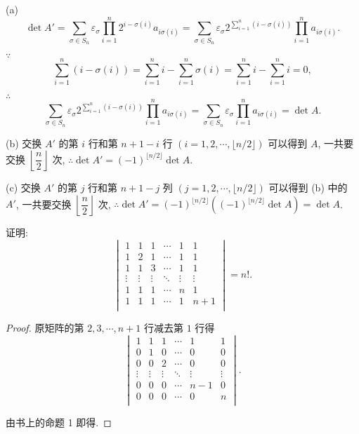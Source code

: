 \documentclass{ctexart}
\begin{document}
\begin{solution}
    (a)
    \[\det A'=\sum\limits_{\sigma\in S_n}\varepsilon_\sigma\prod\limits_{i=1}^n2^{i-\sigma(i)}a_{i\sigma(i)}=\sum\limits_{\sigma\in S_n}\varepsilon_\sigma2^{\sum\limits_{i=1}^n (i-\sigma(i))}\prod\limits_{i=1}^na_{i\sigma(i)}.\]

    $\because$
    \[\sum\limits_{i=1}^n (i-\sigma(i))=\sum\limits_{i=1}^ni-\sum\limits_{i=1}^n\sigma(i)=\sum\limits_{i=1}^ni-\sum\limits_{i=1}^ni=0,\]

    $\therefore$
    \[\sum\limits_{\sigma\in S_n}\varepsilon_\sigma2^{\sum\limits_{i=1}^n(i-\sigma(i))}\prod\limits_{i=1}^na_{i\sigma(i)}=\sum\limits_{\sigma\in S_n}\varepsilon_\sigma\prod\limits_{i=1}^na_{i\sigma(i)}=\det A.\]

    (b) 交换 $A'$ 的第 $i$ 行和第 $n+1-i$ 行 $(i=1,2,\cdots,\lfloor n/2\rfloor)$ 可以得到 $A$, 一共要交换 $\left\lfloor\dfrac{n}{2}\right\rfloor$ 次, $\therefore\det A'=(-1)^{\lfloor n/2\rfloor}\det A$.

    (c) 交换 $A'$ 的第 $j$ 行和第 $n+1-j$ 列 $(j=1,2,\cdots,\lfloor n/2\rfloor)$ 可以得到 (b) 中的 $A'$, 一共要交换 $\left\lfloor\dfrac{n}{2}\right\rfloor$ 次, $\therefore\det A'=(-1)^{\lfloor n/2\rfloor}((-1)^{\lfloor n/2\rfloor}\det A)=\det A$.
\end{solution}
\begin{exercise}%
    证明:
    \[\begin{vmatrix}
    1 & 1 & 1 & \cdots & 1 & 1 \\
    1 & 2 & 1 & \cdots & 1 & 1 \\
    1 & 1 & 3 & \cdots & 1 & 1 \\
    \vdots & \vdots & \vdots & \ddots & \vdots & \vdots \\
    1 & 1 & 1 & \cdots  & n & 1 \\
    1 & 1 & 1 & \cdots  & 1 & n+1 \\
\end{vmatrix}=n!.\]
\end{exercise}
\begin{proof}
    原矩阵的第 $2,3,\cdots,n+1$ 行减去第 $1$ 行得
    \[\begin{vmatrix}
        1 & 1 & 1 & \cdots & 1 & 1 \\
        0 & 1 & 0 & \cdots & 0 & 0 \\
        0 & 0 & 2 & \cdots & 0 & 0 \\
        \vdots & \vdots & \vdots & \ddots & \vdots & \vdots \\
        0 & 0 & 0 & \cdots  & n-1 & 0 \\
        0 & 0 & 0 & \cdots  & 0 & n \\
    \end{vmatrix}.\]

    由书上的命题 1 即得.
\end{proof}
\end{document}
